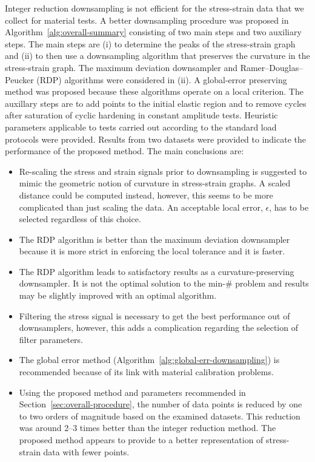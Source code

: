 \documentclass[a4paper,11pt]{article}
\begin{document}
Integer reduction downsampling is not efficient for the stress-strain data that we collect for material tests.
A better downsampling procedure was proposed in Algorithm~\ref{alg:overall-summary} consisting of two main steps and two auxiliary steps.
The main steps are (i) to determine the peaks of the stress-strain graph and (ii) to then use a downsampling algorithm that preserves the curvature in the stress-strain graph.
The maximum deviation downsampler and Ramer–Douglas–Peucker (RDP) algorithms were considered in (ii).
A global-error preserving method was proposed because these algorithms operate on a local criterion.
The auxillary steps are to add points to the initial elastic region and to remove cycles after saturation of cyclic hardening in constant amplitude tests.
Heuristic parameters applicable to tests carried out according to the standard load protocols were provided.
Results from two datasets were provided to indicate the performance of the proposed method.
The main conclusions are:
\begin{itemize}
    \item Re-scaling the stress and strain signals prior to downsampling is suggested to mimic the geometric notion of curvature in stress-strain graphs. A scaled distance could be computed instead, however, this seems to be more complicated than just scaling the data. An acceptable local error, $\epsilon$, has to be selected regardless of this choice.
    \item The RDP algorithm is better than the maximum deviation downsampler because it is more strict in enforcing the local tolerance and it is faster.
    \item The RDP algorithm leads to satisfactory results as a curvature-preserving downsampler. It is not the optimal solution to the min-\# problem and results may be slightly improved with an optimal algorithm.
    \item Filtering the stress signal is necessary to get the best performance out of downsamplers, however, this adds a complication regarding the selection of filter parameters.
    \item The global error method (Algorithm~\ref{alg:global-err-downsampling}) is recommended because of its link with material calibration problems.
    \item Using the proposed method and parameters recommended in Section~\ref{sec:overall-procedure}, the number of data points is reduced by one to two orders of magnitude based on the examined datasets. This reduction was around 2--3 times better than the integer reduction method. The proposed method appears to provide to a better representation of stress-strain data with fewer points.
\end{itemize}
\end{document}
